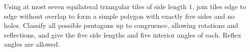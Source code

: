 Using at most seven equilateral triangular tiles of side length $1$, join tiles edge to edge without overlap to form a simple polygon with exactly five sides and no holes. Classify all possible pentagons up to congruence, allowing rotations and reflections, and give the five side lengths and five interior angles of each. Reflex angles are allowed.
